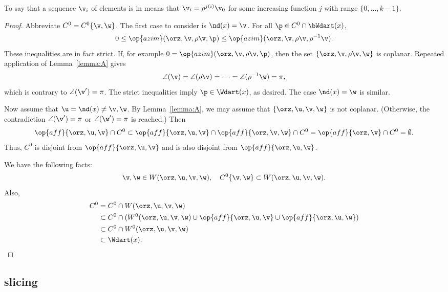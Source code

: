 To say that a sequence $\v_i$ of elements is in  means that $\v_i = \rho^{j (i)}\v_0$ for some increasing
function $j$ with range $\{0,\ldots,k-1\}$.

\begin{proof} Abbreviate $C^0 = C^0\{\v,\w\}$.  The first case to
consider is $\nd(x)=\v$.  For all $\p\in C^0\cap \bWdart(x)$,
\[ 
  0 \le \op{azim}(\orz,\v,\rho \v,\p) 
\le \op{azim}(\orz,\v,\rho \v,\rho^{-1} \v).
\]   
These inequalities are in fact strict.  If, for example $0 =
\op{azim}(\orz,\v,\rho \v,\p)$, then the set $\{\orz,\v,\rho \v,\w\}$
is coplanar.  Repeated application of Lemma~\ref{lemma:A} gives
\[ 
\angle(\v) = \angle(\rho \v) = \cdots = \angle(\rho^{-1} \w) = \pi,
\] 
which is contrary to $\angle(\v') = \pi$.  The strict inequalities
imply $\p\in \Wdart(x)$, as desired.  The case $\nd(x)=\w$ is similar.

Now assume that $\u=\nd(x)\ne \v,\w$.  By Lemma~\ref{lemma:A}, we may
assume that $\{\orz,\u,\v,\w\}$ is not coplanar.  (Otherwise, the
contradiction $\angle(\v')=\pi$ or $\angle(\w')=\pi$ is reached.) Then
\[ 
  \op{aff}\{\orz,\u,\v\}\cap C^0 \subset \op{aff}\{\orz,\u,\v\}
  \cap \op{aff}\{\orz,\v,\w\} \cap C^0 
= \op{aff}\{\orz,\v\} \cap C^0 = \emptyset.
\] 
Thus, $C^0$ is disjoint from $\op{aff}\{\orz,\u,\v\}$ and is also
disjoint from $\op{aff}\{\orz,\u,\w\}$.

We have the following facts:
\[ 
\v,\w\in W(\orz,\u,\v,\w),\quad C^0\{\v,\w\} \subset W(\orz,\u,\v,\w).
\] 
Also,
\begin{align*}
  C^0 &= C^0\cap W(\orz,\u,\v,\w) \\
  &\subset C^0 \cap (W^0(\orz,\u,\v,\w) 
\cup \op{aff}\{\orz,\u,\v\} \cup \op{aff}\{\orz,\u,\w\})\\
  &\subset C^0 \cap W^0(\orz,\u,\v,\w)\\
  &\subset \Wdart(x).
\end{align*}
\end{proof}


\subsection{slicing}

